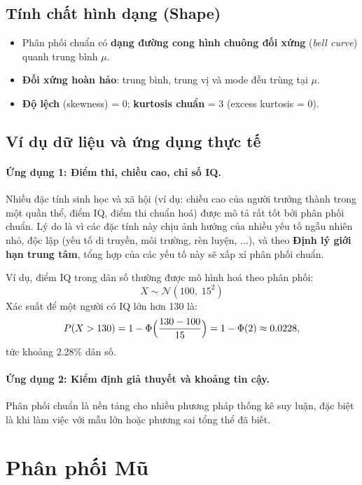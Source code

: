 \documentclass[a4paper,12pt]{article}
\begin{document}
\subsection{Tính chất hình dạng (Shape)}

\begin{itemize}
    \item Phân phối chuẩn có \textbf{dạng đường cong hình chuông đối xứng} (\textit{bell curve}) quanh trung bình $\mu$.
    \item \textbf{Đối xứng hoàn hảo}: trung bình, trung vị và mode đều trùng tại $\mu$.
    \item \textbf{Độ lệch} (skewness) = 0; \textbf{kurtosis chuẩn} = 3 (excess kurtosis = 0).
\end{itemize}

\subsection{Ví dụ dữ liệu và ứng dụng thực tế }

\paragraph{Ứng dụng 1: Điểm thi, chiều cao, chỉ số IQ.}  
Nhiều đặc tính sinh học và xã hội (ví dụ: chiều cao của người trưởng thành trong một quần thể, điểm IQ, điểm thi chuẩn hoá) được mô tả rất tốt bởi phân phối chuẩn.  
Lý do là vì các đặc tính này chịu ảnh hưởng của nhiều yếu tố ngẫu nhiên nhỏ, độc lập (yếu tố di truyền, môi trường, rèn luyện, ...), và theo \textbf{Định lý giới hạn trung tâm}, tổng hợp của các yếu tố này sẽ xấp xỉ phân phối chuẩn.

Ví dụ, điểm IQ trong dân số thường được mô hình hoá theo phân phối:
\[
X \sim \mathcal{N}(100,\;15^2)
\]
Xác suất để một người có IQ lớn hơn 130 là:
\[
P(X > 130) = 1 - \Phi\Bigl(\frac{130 - 100}{15}\Bigr) 
= 1 - \Phi(2) \approx 0.0228,
\]
tức khoảng 2.28\% dân số.

\paragraph{Ứng dụng 2: Kiểm định giả thuyết và khoảng tin cậy.}  
Phân phối chuẩn là nền tảng cho nhiều phương pháp thống kê suy luận, đặc biệt là khi làm việc với mẫu lớn hoặc phương sai tổng thể đã biết.  


\section{Phân phối Mũ}
\end{document}
